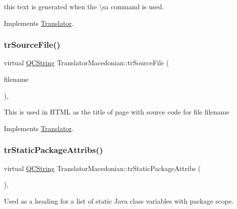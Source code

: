 this text is generated when the \textbackslash{}sa command is used. 

Implements \mbox{\hyperlink{class_translator}{Translator}}.

\mbox{\label{class_translator_macedonian_a8ddb69c60f68ba801c7b1846e1241e26}} 
\subsubsection{\texorpdfstring{trSourceFile()}{trSourceFile()}}
{\footnotesize\ttfamily virtual \mbox{\hyperlink{class_q_c_string}{Q\+C\+String}} Translator\+Macedonian\+::tr\+Source\+File (\begin{DoxyParamCaption}\item[{\mbox{\hyperlink{class_q_c_string}{Q\+C\+String}} \&}]{filename }\end{DoxyParamCaption})\hspace{0.3cm}{\ttfamily [inline]}, {\ttfamily [virtual]}}

This is used in H\+T\+ML as the title of page with source code for file filename 

Implements \mbox{\hyperlink{class_translator}{Translator}}.

\mbox{\label{class_translator_macedonian_abf0192b50e19b2e5b01c785657417619}} 
\subsubsection{\texorpdfstring{trStaticPackageAttribs()}{trStaticPackageAttribs()}}
{\footnotesize\ttfamily virtual \mbox{\hyperlink{class_q_c_string}{Q\+C\+String}} Translator\+Macedonian\+::tr\+Static\+Package\+Attribs (\begin{DoxyParamCaption}{ }\end{DoxyParamCaption})\hspace{0.3cm}{\ttfamily [inline]}, {\ttfamily [virtual]}}

Used as a heading for a list of static Java class variables with package scope. 


